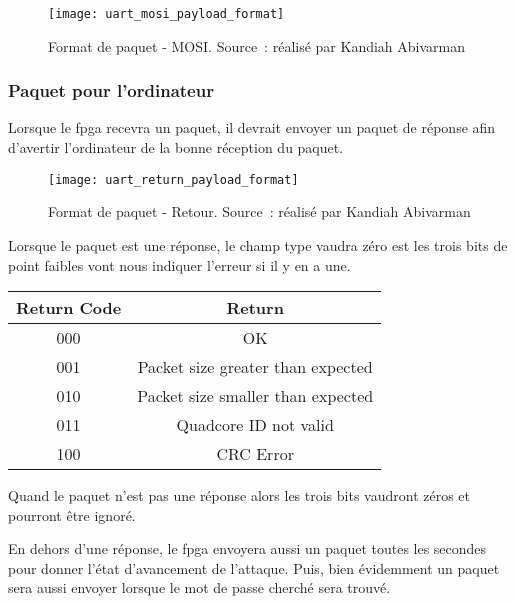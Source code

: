 \begin{figure}[tbph!]
	\centering
	\texttt{[image: uart\_mosi\_payload\_format]}
	\caption[Format de paquet - MOSI]{Format de paquet - MOSI. Source : réalisé par Kandiah Abivarman}
	\label{fig:uart_mosi_payload_format}
\end{figure}

\newpage

\subsubsection{Paquet pour l'ordinateur}

Lorsque le \gls{fpga} recevra un paquet, il devrait envoyer un paquet de réponse afin d'avertir l'ordinateur de la bonne réception du paquet.

\begin{figure}[tbph!]
	\centering
	\texttt{[image: uart\_return\_payload\_format]}
	\caption[Format de paquet - Retour]{Format de paquet - Retour. Source : réalisé par Kandiah Abivarman}
	\label{fig:uart_return_payload_format}
\end{figure}

Lorsque le paquet est une réponse, le champ type vaudra zéro est les trois bits de point faibles vont nous indiquer l'erreur si il y en a une.\\

\begin{table}[tbph!]
	\centering
	\begin{tabular}{|c|c|}
	\hline
	\textbf{Return Code} & \textbf{Return}                   \\ \hline
	000                  & OK                                \\ \hline
	001                  & Packet size greater than expected \\ \hline
	010                  & Packet size smaller than expected \\ \hline
	011                  & Quadcore ID not valid             \\ \hline
	100                  & CRC Error                         \\ \hline
	\end{tabular}
\end{table}

Quand le paquet n'est pas une réponse alors les trois bits vaudront zéros et pourront être ignoré. 

\newpage

En dehors d'une réponse, le \gls{fpga} envoyera aussi un paquet toutes les secondes pour donner l'état d'avancement de l'attaque.
Puis, bien évidemment un paquet sera aussi envoyer lorsque le mot de passe cherché sera trouvé.

